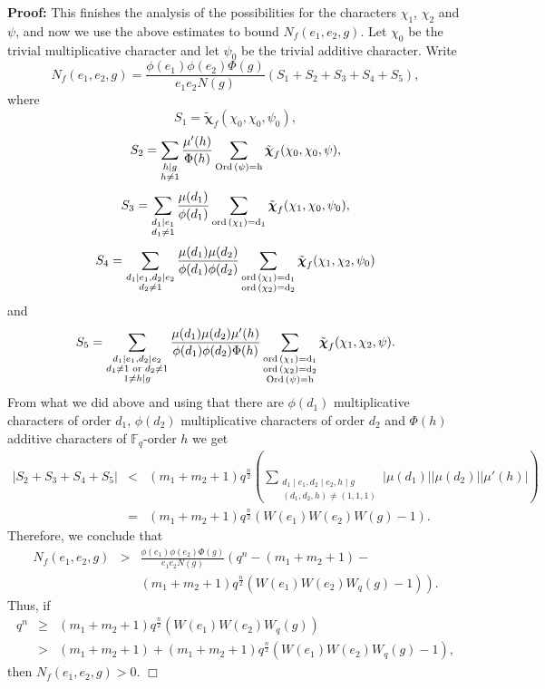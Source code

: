 \documentclass[12pt]{article}
\newenvironment{proof}{\noindent \textbf{Proof: }}{\hfill
$\Box$  \vspace{1ex}}
\newcommand{\F}{\mathbb{F}}
\def\bchi{\boldsymbol{\chi}}
\def \ord {\rm{ord}\,}
\def \Ord {\rm{Ord}\,}
\begin{document}
\begin{proof}
This finishes the analysis of the possibilities for the characters $\chi_1$, 
$\chi_2$ and $\psi$, and 
now we use the above estimates to bound $N_{f}(e_1,e_2,g)$. 
Let $\chi_0$ be the trivial multiplicative character and let
$\psi_0$ be the trivial additive character.
Write
$$
N_{f}(e_1,e_2,g)
=
\frac{\phi(e_1)\phi(e_2) \Phi(g)}{e_1 e_2 N(g)}
(S_1 + S_2 + S_3 + S_4 + S_5),
$$
where
$$S_1=\tilde{\bchi}_f (\chi_0,\chi_0,\psi_0),$$ %
$$
S_2=
\sum_{\substack{h\mid g \\ h \neq 1}}
\frac{\mu'(h)}{\Phi(h)}
\sum_{\substack{\Ord(\psi)=h}}
\tilde{\bchi}_f (\chi_0,\chi_0,\psi),
$$
$$
S_3=
\sum_{\substack{d_1\mid e_1  \\
		                   d_1 \neq 1}}
\frac{\mu(d_1)}{\phi(d_1)}
\sum_{\ord(\chi_1)=d_1}
\tilde{\bchi}_f (\chi_1,\chi_0,\psi_0),
$$
$$
S_4=
\sum_{\substack{d_1\mid e_1 , d_2\mid e_2 \\ 
		d_2 \neq 1}}
\frac{\mu(d_1)\mu(d_2)}{\phi(d_1)\phi(d_2)}
\sum_{\substack{\ord(\chi_1)=d_1 \\ \ord(\chi_2)=d_2}}
\tilde{\bchi}_f (\chi_1,\chi_2,\psi_0)
$$
and
$$
S_5=
\sum_{\substack{d_1\mid e_1 , d_2\mid e_2 \\ 
		   d_1 \neq 1 \text{ or } d_2 \neq 1 \\
	        1 \neq h\mid g}}
\frac{\mu(d_1)\mu(d_2) \mu'(h)}{\phi(d_1)\phi(d_2) \Phi(h)}
\sum_{\substack{\ord(\chi_1)=d_1 \\ \ord(\chi_2)=d_2 \\ \Ord(\psi)=h}}
\tilde{\bchi}_f (\chi_1,\chi_2,\psi).
$$
From what we did above and using that
there are $\phi(d_1)$ multiplicative characters of order $d_1$, $\phi(d_2)$
multiplicative characters of order $d_2$
and $\Phi(h)$ additive characters of $\F_q$-order $h$
 we get
\begin{eqnarray}
|S_2+S_3+S_4+S_5| & < &
(m_1+m_2+1)q^{\frac{n}{2}}
\left(
\sum_{\substack{d_1 \mid e_1, d_2\mid e_2, h \mid g \\ (d_1,d_2,h) \neq (1,1,1)}}
|\mu(d_1)| |\mu(d_2)| |\mu'(h)|
\right) \nonumber \\
& = & 
(m_1+m_2+1)q^{\frac{n}{2}}
\left(
W(e_1)W(e_2)W(g) - 1
\right). \nonumber
\end{eqnarray}
Therefore, we conclude that
\begin{eqnarray}
\displaystyle N_{f}(e_1,e_2,g) & > &\frac{\phi(e_1)\phi(e_2) \Phi(g)}{e_1 e_2 
N(g)}
\left(
q^n-(m_1+m_2+1)- \right. \nonumber \\
& & \left. (m_1+m_2+1)q^{\frac{n}{2}}(W(e_1)W(e_2)W_q(g)-1)
\right). \nonumber
\end{eqnarray}
Thus, if
\begin{eqnarray}
q^n & \geq & (m_1+m_2+1)q^{\frac{n}{2}}(W(e_1)W(e_2)W_q(g))
\nonumber \\
      & > & (m_1+m_2+1)+(m_1+m_2+1)q^{\frac{n}{2}}(W(e_1)W(e_2)W_q(g)-1) ,
\nonumber
\end{eqnarray}
then
$N_f(e_1,e_2,g)>0$.
\end{proof}
\end{document}
